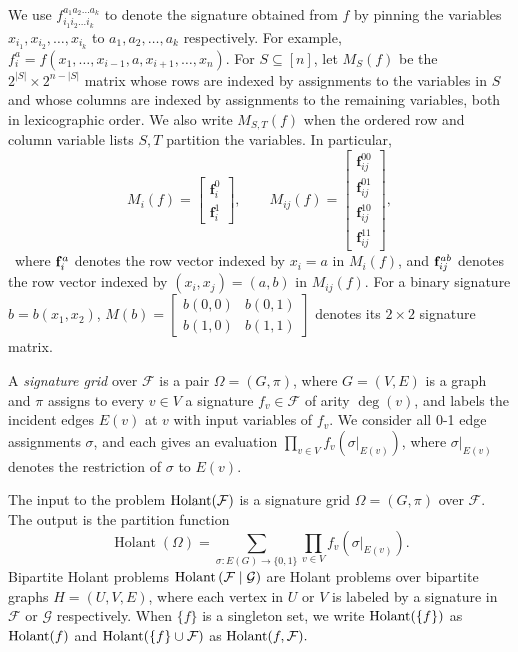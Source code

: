 We use $f_{i_1i_2\ldots i_k}^{a_1a_2\ldots a_k}$ to denote the signature obtained from $f$ by pinning the variables $x_{i_1},x_{i_2},\ldots, x_{i_k}$ to $a_{1},a_2,\ldots, a_k$ respectively.
For example, $f_{i}^a=f(x_1,\ldots,x_{i-1},a,x_{i+1},\ldots,x_n).$
For $S\subseteq[n]$, let $M_S(f)$ be the
$2^{|S|}\times2^{n-|S|}$ matrix whose rows are indexed by assignments
to the variables in $S$ and whose columns are indexed by assignments to
the remaining variables, both in lexicographic order.  We also write
$M_{S,T}(f)$ when the ordered row and column variable lists $S,T$
partition the variables.  In particular,
\[
M_i(f)=
\begin{bmatrix}\mathbf f_i^0\\ \mathbf f_i^1\end{bmatrix},
\qquad
M_{ij}(f)=
\begin{bmatrix}
\mathbf f_{ij}^{00}\\ \mathbf f_{ij}^{01}\\
\mathbf f_{ij}^{10}\\ \mathbf f_{ij}^{11}
\end{bmatrix},
\]\
where $ {\bf {f}}^{a}_{i}$ denotes the row vector indexed by $x_i=a$ in $M_{i}(f)$, and ${\bf {f}}^{ab}_{ij}$ denotes the row vector indexed by $(x_i, x_j)=(a, b)$ in $M_{i j}(f)$.
For a binary signature $b=b(x_1,x_2)$, $M(b)=\left[\begin{smallmatrix}
    b(0,0) & b(0,1)\\
    b(1,0) & b(1,1)
\end{smallmatrix}\right]$ denotes its $2\times2$ signature matrix.




A \emph{signature grid} over $\mathcal F$ is a pair
$\Omega=(G,\pi)$, where $G=(V,E)$ is a graph and $\pi$ assigns to every
$v\in V$ a signature $f_v\in\mathcal F$ of arity $\deg(v)$, and labels the incident edges $E(v)$ at $v$ with input variables of $f_v$.
We consider all 0-1 edge assignments $\sigma$, and each gives an evaluation $\prod_{v\in V}f_v(\sigma|_{E(v)})$, where $\sigma|_{E(v)}$ denotes the restriction of $\sigma$ to $E(v)$.

\begin{definition}
The input to the problem $\operatorname{Holant}(\mathcal{F})$ is a signature grid $\Omega=(G,\pi)$ over $\mathcal{F}$.
The output is the partition function
\[
\operatorname{Holant}({\Omega})
=\sum_{\sigma:E(G)\to\{0,1\}}
 \prod_{v\in V}f_v(\sigma|_{E(v)}).
\]
Bipartite Holant problems $\operatorname{Holant}\left(\mathcal{F}\mid \mathcal{G}\right)$
are {Holant} problems
 over bipartite graphs $H = (U,V,E)$,
where each vertex in $U$ or $V$ is labeled by a signature in $\mathcal{F}$ or $\mathcal{G}$ respectively.
When $\{f\}$ is a singleton set, we write $\operatorname{Holant}(\{f\})$ as $\operatorname{Holant}(f)$ and  $\operatorname{Holant}(\{f\}\cup \mathcal{F})$ as $\operatorname{Holant}(f, \mathcal{F}).$ 
\end{definition}

